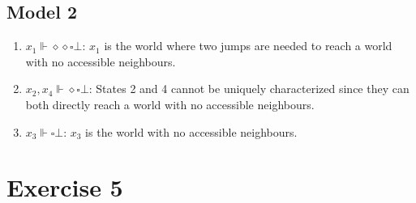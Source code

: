 \documentclass[11pt]{exam}
\begin{document}
\subsection*{Model 2}
\begin{enumerate}
    \item \(x_1 \Vdash \diamond \diamond \square \bot\): \(x_1\) is the world where two jumps are needed to reach a world with no accessible neighbours.
    \item \(x_2, x_4 \Vdash \diamond \square \bot\): States 2 and 4 cannot be uniquely characterized since they can both directly reach a world with no accessible neighbours.
    \item \(x_3 \Vdash \square \bot \): \(x_3\) is the world with no accessible neighbours.
\end{enumerate}
\section*{Exercise 5}
\end{document}

